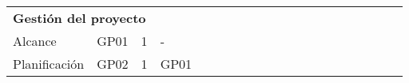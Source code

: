 \begin{longtable}[c]{llclllllllllllllllll}
        \multicolumn{4}{|l|}{\textbf{Gestión del proyecto}}                                                                                                                                                                                                                                                                                                                                & \multicolumn{15}{l|}{}                                                                                                                                                                                                                                                                                                                                                                                                                                                                                                                    &  \\ \cline{1-19}
        \multicolumn{1}{|l|}{Alcance}                                                                                           & \multicolumn{1}{l|}{GP01}                                                      & \multicolumn{1}{c|}{1}                                                           & \multicolumn{1}{l|}{-}                                                               & \cellcolor[HTML]{C6E0B4}        & \cellcolor[HTML]{C6E0B4}        & \cellcolor[HTML]{C6E0B4}        & \cellcolor[HTML]{C6E0B4}        & \cellcolor[HTML]{C6E0B4}        &                                 &                                 &                                 &                                 &                                 &                                 &                                 &                                 &                                 & \multicolumn{1}{l|}{}                         &  \\ \cline{1-4}
        \multicolumn{1}{|l|}{Planificación}                                                                                     & \multicolumn{1}{l|}{GP02}                                                      & \multicolumn{1}{c|}{1}                                                           & \multicolumn{1}{l|}{GP01}                                                            &                                 &                                 &                                 &                                 &                                 & \cellcolor[HTML]{C6E0B4}        & \cellcolor[HTML]{C6E0B4}        & \cellcolor[HTML]{C6E0B4}        & \cellcolor[HTML]{C6E0B4}        & \cellcolor[HTML]{C6E0B4}        &                                 &                                 &                                 &                                 & \multicolumn{1}{l|}{}                         &  \\ \cline{1-4}

\end{longtable}
